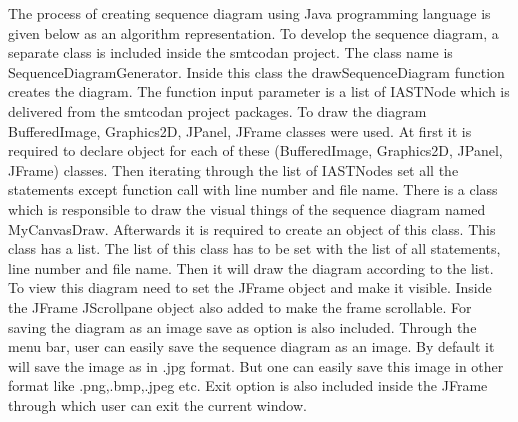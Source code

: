 The process of creating sequence diagram using Java programming language is given below as an algorithm representation. To develop the sequence diagram, a separate class is included inside the smtcodan project. The class name is SequenceDiagramGenerator. Inside this class the drawSequenceDiagram function creates the diagram. The function input parameter is a list of IASTNode which is delivered from the smtcodan project packages. To draw the diagram BufferedImage, Graphics2D, JPanel, JFrame  classes were used. At first it is required to declare object for each of these (BufferedImage, Graphics2D, JPanel, JFrame) classes. Then iterating through the list of IASTNodes set all the statements except function call with line number and file name. There is a class which is responsible to draw the visual things of the sequence diagram named MyCanvasDraw. Afterwards it is required to create an object of this class. This class has a list. The list of this class has to be set with the list of all statements, line number  and file name. Then it will draw the diagram according to the list. To view this diagram need to set the JFrame object and make it visible. Inside the JFrame JScrollpane object also added to make the frame scrollable. For saving the diagram as an image save as option is also included. Through the menu bar, user can easily save the sequence diagram as an image. By default it will save the image as in .jpg format. But one can easily save this image in other format like .png,.bmp,.jpeg etc. Exit option is also included inside the JFrame through which user can exit the current window.  


